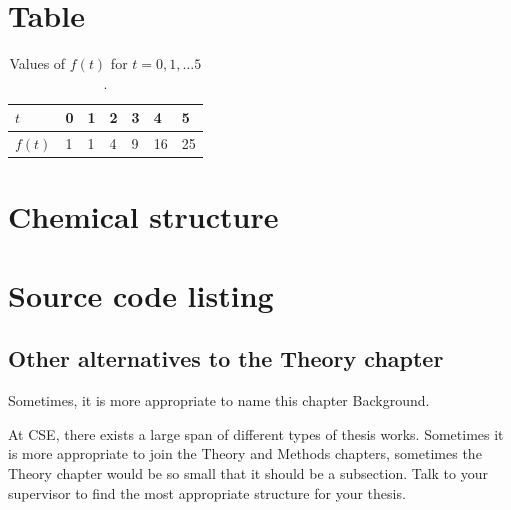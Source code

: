 \section{Table}
\begin{table}[H]
\centering
\caption{Values of $f(t)$ for $t=0,1,\dots 5$.}
\begin{tabular}{l|llllll} \hline\hline
$t$ & 0 & 1 & 2 & 3 & 4 & 5 \\ \hline
$f(t)$ & 1 & 1 & 4 & 9 & 16 & 25 \\ \hline\hline
\end{tabular}
\end{table}

\section{Chemical structure}
\begin{center}
\end{center}


\section{Source code listing}


\subsection{Other alternatives to the Theory chapter}
Sometimes, it is more appropriate to name this chapter Background.

At CSE, there exists a large span of different types of thesis works. Sometimes it is more appropriate to join the Theory and Methods chapters, sometimes the Theory chapter would be so small that it should be a subsection. Talk to your supervisor to find the most appropriate structure for your thesis.